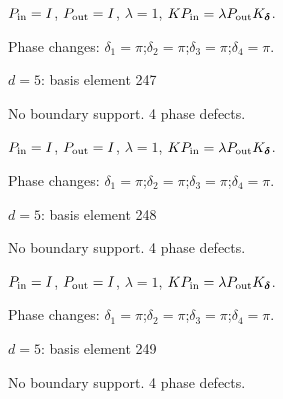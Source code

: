 \vspace{-1mm}
$P_{\rm in}=I$, \quad $P_{\rm out}=I$, \quad $\lambda=1$, \qquad $K P_{\rm in}=\lambda P_{\rm out}K_{\boldsymbol\delta}$.
\par\smallskip\begin{minipage}{.98\linewidth}\small Phase changes: $\delta_{1}=\pi$;\quad $\delta_{2}=\pi$;\quad $\delta_{3}=\pi$;\quad $\delta_{4}=\pi$.\end{minipage}
\vfill
{\footnotesize\texttt{}}
\newpage
{}
{\Large $d=5$: basis element 247}\par
No boundary support. 4 phase defects.
\begin{center}
\end{center}
\vspace{-1mm}
$P_{\rm in}=I$, \quad $P_{\rm out}=I$, \quad $\lambda=1$, \qquad $K P_{\rm in}=\lambda P_{\rm out}K_{\boldsymbol\delta}$.
\par\smallskip\begin{minipage}{.98\linewidth}\small Phase changes: $\delta_{1}=\pi$;\quad $\delta_{2}=\pi$;\quad $\delta_{3}=\pi$;\quad $\delta_{4}=\pi$.\end{minipage}
\vfill
{\footnotesize\texttt{}}
\newpage
{}
{\Large $d=5$: basis element 248}\par
No boundary support. 4 phase defects.
\begin{center}
\end{center}
\vspace{-1mm}
$P_{\rm in}=I$, \quad $P_{\rm out}=I$, \quad $\lambda=1$, \qquad $K P_{\rm in}=\lambda P_{\rm out}K_{\boldsymbol\delta}$.
\par\smallskip\begin{minipage}{.98\linewidth}\small Phase changes: $\delta_{1}=\pi$;\quad $\delta_{2}=\pi$;\quad $\delta_{3}=\pi$;\quad $\delta_{4}=\pi$.\end{minipage}
\vfill
{\footnotesize\texttt{}}
\newpage
{}
{\Large $d=5$: basis element 249}\par
No boundary support. 4 phase defects.
\begin{center}
\end{center}
\vspace{-1mm}
